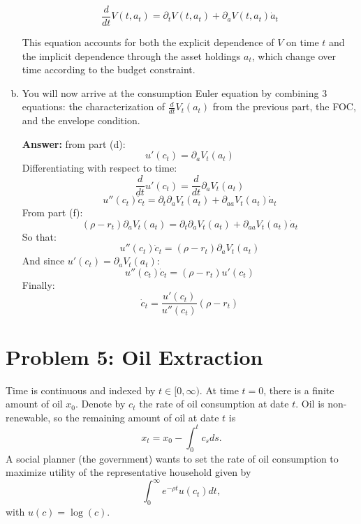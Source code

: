 \documentclass[11pt]{extarticle}
\theoremstyle{plain}
\theoremstyle{definition}
\begin{document}
\begin{enumerate}[(a)]
    \[
    \frac{d}{dt} V(t, a_t) = \partial_t V(t, a_t) + \partial_a V(t, a_t) \dot{a}_t
    \]
    
    This equation accounts for both the explicit dependence of \(V\) on time \(t\) and the implicit dependence through the asset holdings \(a_t\), which change over time according to the budget constraint.

\item You will now arrive at the consumption Euler equation by combining 3 equations: the characterization of $\frac{d}{dt} V_t(a_t)$ from the previous part, the FOC, and the envelope condition.

\textbf{Answer:} from part (d):  
    \[
    u'(c_t) = \partial_a V_t(a_t)
    \]
    Differentiating with respect to time:
    \[
    \frac{d}{dt} u'(c_t) = \frac{d}{dt} \partial_a V_t(a_t)
    \]
    \[
    u''(c_t) \dot{c}_t = \partial_t \partial_a V_t(a_t) + \partial_{aa} V_t(a_t) \dot{a}_t
    \]
    From part (f):
    \[
    (\rho - r_t) \partial_a V_t(a_t) = \partial_t \partial_a V_t(a_t) + \partial_{aa} V_t(a_t) \dot{a}_t
    \]
    So that:
    \[
    u''(c_t) \dot{c}_t = (\rho - r_t) \partial_a V_t(a_t)
    \]
    And since \(u'(c_t) = \partial_a V_t(a_t)\):  
    \[
    u''(c_t) \dot{c}_t = (\rho - r_t) u'(c_t)
    \]
    Finally:
\[
\dot{c}_t = \frac{u'(c_t)}{u''(c_t)} (\rho - r_t)
\]


\end{enumerate}



\vspace{5mm}
\section*{Problem 5: Oil Extraction}

Time is continuous and indexed by $t \in [0, \infty)$. At time $t=0$, there is a finite amount of oil $x_0$. Denote by $c_t$ the rate of oil consumption at date $t$. Oil is non-renewable, so the remaining amount of oil at date $t$ is 
\begin{equation*}
	x_t = x_0 - \int_0^t c_s ds.
\end{equation*}
A social planner (the government) wants to set the rate of oil consumption to maximize utility of the representative household given by
\begin{equation*}
	\int_0^\infty e^{- \rho t} u(c_t) dt,
\end{equation*}
with $u(c) = \log(c)$. 
\end{document}
